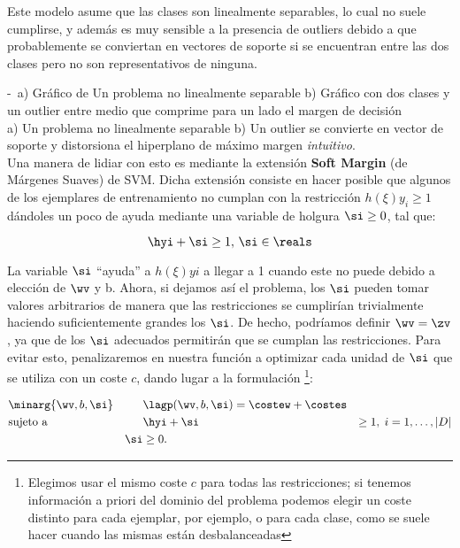 Este modelo asume que las clases son linealmente separables, lo cual no suele cumplirse, y además es muy sensible a la presencia de outliers debido a que probablemente se conviertan en vectores de soporte si se encuentran entre las dos clases pero no son representativos de ninguna.

-\
a) Gráfico de Un problema no linealmente separable  b) Gráfico con dos clases y un outlier entre medio que comprime para un lado el margen de decisión\\
a) Un problema no linealmente separable b) Un outlier se convierte en vector de soporte y distorsiona el hiperplano de máximo margen \textit{intuitivo}.\\

Una manera de lidiar con esto es mediante la extensión \textbf{Soft Margin} (de Márgenes Suaves) de SVM. Dicha extensión consiste en hacer posible que algunos de los ejemplares de entrenamiento no cumplan con la restricción $h(\xi) y_i \geq 1$ dándoles un poco de ayuda mediante una variable de holgura $\si \geq 0$, tal que:

\begin{equation}
\hyi + \si \geq 1, \, \si \in \reals
\end{equation}


La variable $\si$ ``ayuda'' a $h(\xi) yi$ a llegar a 1 cuando este no puede debido a elección de $\wv$ y b. Ahora, si dejamos así el problema, los $\si$ pueden tomar valores arbitrarios de manera que las restricciones se cumplirían trivialmente haciendo suficientemente grandes los $\si$. De hecho, podríamos definir $\wv = \zv$, ya que de los $\si$ adecuados permitirán que se cumplan las restricciones. Para evitar esto, penalizaremos en nuestra función a optimizar cada unidad de $\si$ que se utiliza con un coste $c$, dando lugar a la formulación \footnote{Elegimos usar el mismo coste $c$ para todas las restricciones; si tenemos información a priori del dominio del problema podemos elegir un coste distinto para cada ejemplar, por ejemplo, o para cada clase, como se suele hacer cuando las mismas están desbalanceadas  }:


\begin{equation*}
\begin{aligned}
& \minarg{\wv,b,\si}
& &  \lagp(\wv,b,\si)= \costew + \costes \\
& \text{sujeto a}
& &  \hyi + \si &\geq 1, \; i = 1, \ldots, |D| \\ 
& & \si &\geq 0.
\end{aligned}
\end{equation*}

